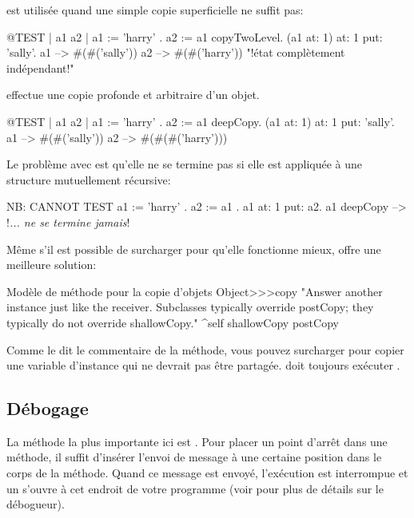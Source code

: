 \documentclass[a4paper,10pt,twoside]{book}
\begin{document}
 est utilisée quand une simple copie superficielle ne suffit pas:

\begin{code}{@TEST | a1 a2 |}
a1 := { { 'harry' } } .
a2 := a1 copyTwoLevel.
(a1 at: 1) at: 1 put: 'sally'.
a1 --> #(#('sally'))
a2 --> #(#('harry'))    "!état complètement indépendant!"
\end{code}

 effectue une copie profonde et arbitraire d'un objet.

\begin{code}{@TEST | a1 a2 |}
a1 := { { { 'harry' } } } .
a2 := a1 deepCopy.
(a1 at: 1) at: 1 put: 'sally'.
a1 --> #(#('sally'))
a2 --> #(#(#('harry')))
\end{code}

Le problème avec  est qu'elle ne se termine pas si elle est appliquée 
à une structure mutuellement récursive:

\begin{code}{NB: CANNOT TEST}
a1 := { 'harry' }.
a2 := { a1 }.
a1 at: 1 put: a2.
a1 deepCopy --> !\emph{... ne se termine jamais}!
\end{code}

Même s'il est possible de surcharger  pour qu'elle fonctionne 
mieux,  offre une meilleure solution:

\begin{method}{Modèle de méthode pour la copie d'objets}
Object>>>copy
    "Answer another instance just like the receiver.
    Subclasses typically override postCopy;
    they typically do not override shallowCopy."
    ^self shallowCopy postCopy
\end{method}

Comme le dit le commentaire de la méthode,
vous pouvez surcharger  pour copier une variable d'instance qui ne devrait pas être partagée.  doit toujours exécuter .


\subsection{Débogage}

La méthode la plus importante ici est . Pour
placer un point d'arrêt dans une méthode, il suffit d'insérer
l'envoi de message  à une certaine position dans le
corps de la méthode.  Quand ce message est envoyé, l'exécution
est interrompue et un  s'ouvre à cet endroit de votre programme
(voir  pour plus de détails sur le débogueur).
\end{document}
